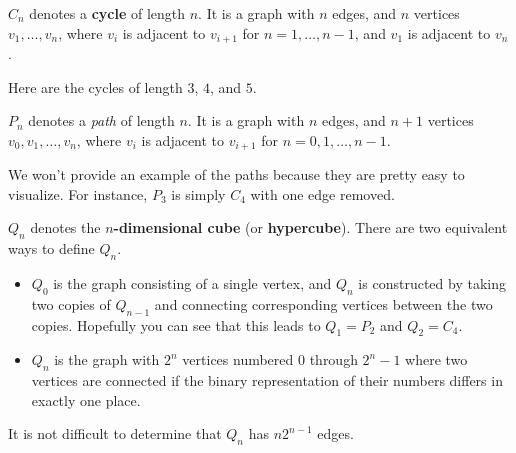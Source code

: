 \begin{df}
$C_n$ denotes a {\bf cycle} of length $n$. It is a graph with $n$
edges, and $n$ vertices $v_1,\ldots , v_n$, where $v_i$ is adjacent
to $v_{i+1}$ for $n= 1, \ldots , n-1$, and $v_1$ is adjacent to $v_n$.
\end{df}

\begin{exa}\label{exa:cycles}
Here are the cycles of length $3$, $4$, and $5$.
\begin{center}
\end{center}
\end{exa}

\begin{df}
$P_n$ denotes a {\em path} of length $n$. It is a graph with $n$
edges, and $n+1$ vertices $v_0, v_1, \ldots , v_n$, where $v_i$ is
adjacent to $v_{i+1}$ for $n= 0, 1, \ldots , n-1$.
\end{df}

We won't provide an example of the paths because they are pretty easy to visualize.
For instance, $P_3$ is simply $C_4$ with one edge removed.

\begin{df}
$Q_n$ denotes the {\bf $n$-dimensional cube} (or {\bf hypercube}). 
There are two equivalent ways to define $Q_n$. 
\begin{itemize}
\item
$Q_0$ is the graph consisting of a single vertex,
and $Q_n$ is constructed by taking two copies of $Q_{n-1}$
and connecting corresponding vertices between the two copies.
Hopefully you can see that this leads to 
$Q_1=P_2$ and $Q_2=C_4$. 
\item
$Q_n$ is the graph with 
$2^n$ vertices numbered $0$ through $2^n-1$
where two vertices are connected if the binary representation
of their numbers differs in exactly one place.
\end{itemize}
It is not difficult to determine that $Q_n$ has $n2^{n-1}$ edges.
\end{df}

